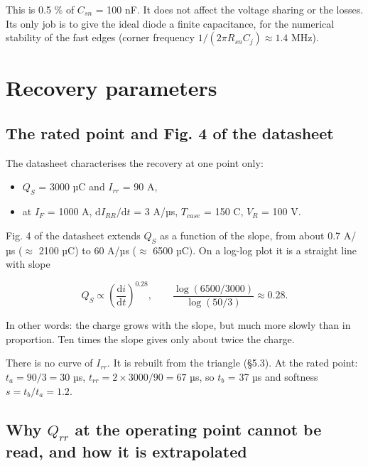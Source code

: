 \documentclass[11pt,a4paper,numbers=noenddot]{scrartcl}
\providecommand{\tightlist}{\setlength{\itemsep}{0pt}\setlength{\parskip}{0pt}}
\begin{document}
\begin{onehalfspace}
This is 0.5 \% of \(C_{sn}\) = 100 nF. It does not affect the voltage sharing or the losses. Its only job is to give the ideal diode a finite capacitance, for the numerical stability of the fast edges (corner frequency \(1/(2\pi R_{sn} C_j) \approx 1.4\) MHz).

\section{Recovery parameters}\label{recovery-parameters}

\subsection{The rated point and Fig. 4 of the datasheet}\label{the-rated-point-and-fig.-4-of-the-datasheet}

The datasheet characterises the recovery at one point only:

\begin{itemize}
\tightlist
\item
  \(Q_S\) = 3000 µC and \(I_{rr}\) = 90 A,
\item
  at \(I_F\) = 1000 A, \(\mathrm{d}I_{RR}/\mathrm{d}t\) = 3 A/µs, \(T_{case}\) = 150 \textdegree{}C, \(V_R\) = 100 V.
\end{itemize}

Fig. 4 of the datasheet extends \(Q_S\) as a function of the slope, from about 0.7 A/µs (\(\approx\) 2100 µC) to 60 A/µs (\(\approx\) 6500 µC). On a log-log plot it is a straight line with slope

\[Q_S \propto \left(\frac{\mathrm{d}i}{\mathrm{d}t}\right)^{0.28}, \qquad \frac{\log(6500/3000)}{\log(50/3)} \approx 0.28. \tag{5.1}\]

\begin{mybox}
In other words: the charge grows with the slope, but much more slowly than in proportion. Ten times the slope gives only about twice the charge.
\end{mybox}

There is no curve of \(I_{rr}\). It is rebuilt from the triangle (\S5.3). At the rated point: \(t_a = 90/3 = 30\) µs, \(t_{rr} = 2 \times 3000/90 = 67\) µs, so \(t_b\) = 37 µs and softness \(s = t_b/t_a = 1.2\).

\subsection{\texorpdfstring{Why \(Q_{rr}\) at the operating point cannot be read, and how it is extrapolated}{Why Q\_\{rr\} at the operating point cannot be read, and how it is extrapolated}}\label{why-q_rr-at-the-operating-point-cannot-be-read-and-how-it-is-extrapolated}


\end{onehalfspace}
\end{document}
